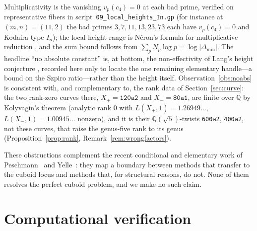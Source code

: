 \documentclass[11pt,reqno]{amsart}
\theoremstyle{plain}
\theoremstyle{definition}
\newcommand{\Q}{\mathbb{Q}}
\begin{document}
Multiplicativity is the vanishing $v_p(c_4)=0$ at each bad prime, verified on
representative fibers in script~\texttt{09\_local\_heights\_In.gp} (for instance at
$(m,n)=(11,2)$ the bad primes $3,7,11,13,23,73$ each have $v_p(c_4)=0$ and Kodaira
type $I_n$); the local-height range is N\'eron's formula for multiplicative
reduction \cite{SilvermanATAEC}, and the sum bound follows from
$\sum_p N_p\log p=\log|\Delta_{\min}|$. The headline ``no absolute constant'' is, at
bottom, the non-effectivity of Lang's height conjecture
\cite{HindrySilverman,Wagener}, recorded here only to locate the one remaining
elementary handle---a bound on the Szpiro ratio---rather than the height itself.
Observation~\ref{obs:noabs} is consistent with, and complementary to, the rank
data of Section~\ref{sec:curve}: the two rank-zero curves there,
$X_+=\texttt{120a2}$ and $X_-=\texttt{80a1}$, are finite over $\Q$ by Kolyvagin's
theorem \cite{kolyvagin} (analytic rank $0$ with $L(X_+,1)=1.26949\ldots$,
$L(X_-,1)=1.00945\ldots$ nonzero), and it is their $\Q(\sqrt5)$-twists
\texttt{600a2}, \texttt{400a2}, not these curves, that raise the genus-five rank to
its genus (Proposition~\ref{prop:rank}, Remark~\ref{rem:wrongfactors}).

These obstructions complement the recent conditional and elementary work of
Peschmann~\cite{peschmann,peschmann2} and Yelle~\cite{Yelle}: they map a boundary
between methods that transfer to the cuboid locus and methods that, for structural
reasons, do not. None of them resolves the perfect cuboid problem, and we make no
such claim.

\section*{Computational verification}
\end{document}
